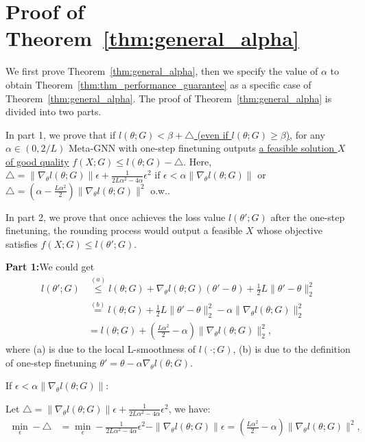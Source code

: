 \section{Proof of Theorem~\ref{thm:general_alpha}}
\label{sec:proof-performance_guarantee}

We first prove Theorem~\ref{thm:general_alpha}, then we specify the value of $\alpha$ to obtain Theorem~\ref{thm:thm_performance_guarantee} as a specific case of Theorem~\ref{thm:general_alpha}. The proof of Theorem~\ref{thm:general_alpha} is divided into two parts. 

In part 1, we prove that if \underline{$l(\theta;G) < \beta + \triangle$ (even if $l(\theta;G) \geq \beta$)}, for any $\alpha \in (0, 2/L)$ Meta-GNN with one-step finetuning outputs \underline{a feasible solution $X$ of good quality} $f(X;G)\leq l(\theta;G)-\triangle$. Here, $\triangle = \|\nabla_{\theta} l(\theta;G)\| \epsilon + \frac{1}{2L\alpha^2 - 4\alpha}\epsilon^2$ if $\epsilon < \alpha \|\nabla_{\theta} l(\theta;G)\|$ or $\triangle = (\alpha - \frac{L\alpha^2}{2})\|\nabla_{\theta}l(\theta;G)\|^2$ o.w..

In part 2, we prove that once \proj achieves the loss value $l(\theta';G)$ after the one-step finetuning, the rounding process would output a feasible $X$ whose objective satisfies $f(X;G)\leq l(\theta';G)$. 

\textbf{Part 1:}We could get 
\begin{equation}
\begin{aligned}
l(\theta';G) 
& \stackrel{(a)}{\leq} l(\theta;G) + \nabla_{\theta}l(\theta;G)(\theta'-\theta) + \frac{1}{2}L \| \theta' - \theta\|_2^2\\
& \stackrel{(b)}{=} l(\theta;G) + \frac{1}{2}L\|\theta' - \theta\|_2^2 - \alpha \|\nabla_{\theta} l(\theta;G)\|_2^2 \\
&  = l(\theta;G)+ (\frac{L\alpha^2}{2} - \alpha) \|\nabla_{\theta} l(\theta;G)\|_2^2,
\end{aligned}
\end{equation}
where (a) is due to the local L-smoothness of $l(\cdot;G)$, (b) is due to the definition of one-step finetuning $\theta' = \theta - \alpha \nabla_{\theta}l(\theta;G)$.

If $\epsilon < \alpha \|\nabla_{\theta}l(\theta;G)\|$:

\qquad Let $\triangle = \|\nabla_{\theta} l(\theta;G)\| \epsilon + \frac{1}{2L\alpha^2 - 4\alpha}\epsilon^2$, we have:
\begin{equation}
\begin{aligned}
\min_{\epsilon} - \triangle & = \min_{\epsilon} -\frac{1}{2L\alpha^2 - 4\alpha} \epsilon^2 - \|\nabla_{\theta}l(\theta;G)\|\epsilon  = (\frac{L\alpha^2}{2}-\alpha)\|\nabla_{\theta}l(\theta;G)\|^2,
\end{aligned}
\end{equation}

